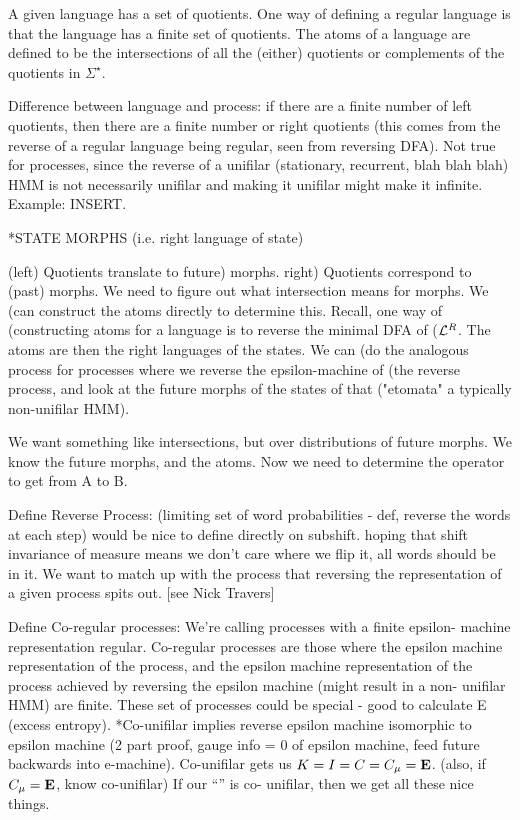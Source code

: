 \documentclass[prl,twocolumn,showpacs,superscriptaddress,preprintnumbers,floatfix]{revtex4-1}
\theoremstyle{plain}    \newtheorem{Lem}{Lemma}
\theoremstyle{plain}    \newtheorem*{ProLem}{Proof}
\theoremstyle{plain}    \newtheorem{Cor}{Corollary}
\theoremstyle{plain}    \newtheorem*{ProCor}{Proof}
\theoremstyle{plain}    \newtheorem{The}{Theorem}
\theoremstyle{plain}    \newtheorem*{ProThe}{Proof}
\theoremstyle{plain}    \newtheorem{Prop}{Proposition}
\theoremstyle{plain}    \newtheorem*{ProProp}{Proof}
\theoremstyle{plain}    \newtheorem*{Conj}{Conjecture}
\theoremstyle{plain}    \newtheorem*{Rem}{Remark}
\theoremstyle{plain}    \newtheorem{Def}{Definition}
\theoremstyle{plain}    \newtheorem*{Not}{Notation}
\begin{document}
A given language \Language has a set of quotients.  One way of defining a
regular language is that the language has a finite set of quotients.  The atoms
of a language are defined to be the intersections of all the (either) quotients
or complements of the quotients in $\Sigma^{\star}$.

Difference between language and process: if there are a finite number of left
quotients, then there are a finite number or right quotients (this comes from
the reverse of a regular language being regular, seen from reversing DFA).  Not
true for processes, since the reverse of a unifilar (stationary, recurrent, blah
blah blah) HMM is not necessarily unifilar and making it unifilar might make it
infinite. Example: INSERT.

*STATE MORPHS (i.e. right language of state)

(left) Quotients translate to future) morphs. right) Quotients correspond to
(past) morphs.  We need to figure out what intersection means for morphs.  We
(can construct the atoms directly to determine this.  Recall, one way of
(constructing atoms for a language \Language is to reverse the minimal DFA of
($\mathcal{L}^{R}$.  The atoms are then the right languages of the states. We can
(do the analogous process for processes where we reverse the epsilon-machine of
(the reverse process, and look at the future morphs of the states of that
("etomata" a typically non-unifilar HMM).

We want something like intersections, but over distributions of future morphs.
We know the future morphs, and the atoms.  Now we need to determine the operator
to get from A to B.

Define Reverse Process: (limiting set of word probabilities - def, reverse the
words at each step) would be nice to define directly on subshift. hoping that
shift invariance of measure means we don't care where we flip it, all words
should be in it.  We want to match up with the process that reversing the
\eM representation of a given process spits out. [see Nick Travers]

Define Co-regular processes: We're calling processes with a finite epsilon-
machine representation regular. Co-regular processes are those where the epsilon
machine representation of the process, and the epsilon machine representation of
the process achieved by reversing the epsilon machine (might result in a non-
unifilar HMM) are finite.  These set of processes could be special - good to
calculate E (excess entropy).  *Co-unifilar implies reverse epsilon machine
isomorphic to epsilon machine (2 part proof, gauge info = 0 of epsilon machine,
feed future backwards into e-machine). Co-unifilar gets us $K = I = C = C_\mu
= {\bf E}$.  (also, if $C_\mu = {\bf E}$, know co-unifilar) If our ``\eT'' is co-
unifilar, then we get all these nice things.
\end{document}
